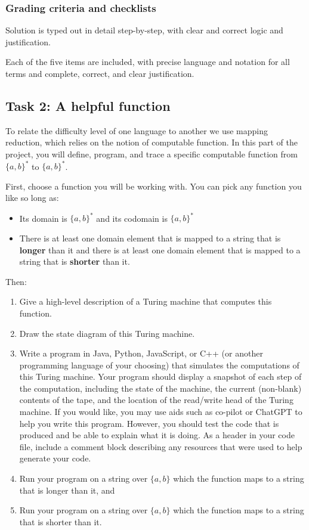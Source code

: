 \subsubsection*{Grading criteria and checklists}

Solution is typed out in detail step-by-step, with clear and 
correct logic and justification.

Each of the five items are included, with precise language and notation
for all terms and complete, correct, and clear justification.

\newpage
\subsection*{Task 2: A helpful function}

To relate the difficulty level of one language to another 
we use mapping reduction, which relies
on the notion of computable function. In this part of the project, 
you will define, program, and trace a specific 
computable function from $\{a,b\}^*$ to $\{a,b\}^*$.

First, choose a function you will be working with. You can pick any function you like so long as:
	\begin{itemize}
		\item Its domain is $\{a,b\}^*$ and its 
                codomain is $\{a,b\}^*$
		\item There is at least one domain 
                element that is mapped to a string that is 
                {\bf longer} than it and there is at least one 
                domain element that is mapped to a string that is 
                {\bf shorter} than it.
	\end{itemize}
Then:
 \begin{enumerate}
    \item Give a high-level description of a Turing machine that computes
    this function.
    \item Draw the state diagram of this Turing machine.
    \item Write a program in Java, Python, JavaScript, or C++ (or 
        another programming language of your choosing)
        that simulates the computations of this Turing machine.
        Your program should display a snapshot of each step of the computation, 
        including the state of the machine, the current (non-blank)
        contents of the tape, and the location of the read/write head
        of the Turing machine. If you would like, you may 
        use aids such as co-pilot or ChatGPT to help you write this 
        program. However, you should test the code that is 
        produced and be able 
        to explain what it is doing. As a header in 
        your code file, include a comment block describing 
        any resources that were used to help
        generate your code.
    \item Run your program on a string over $\{a,b\}$ which 
        the function maps to a string that is longer than it, and
    \item Run your program on a string over $\{a,b\}$ which 
        the function maps to a string that is shorter than it.
\end{enumerate}

